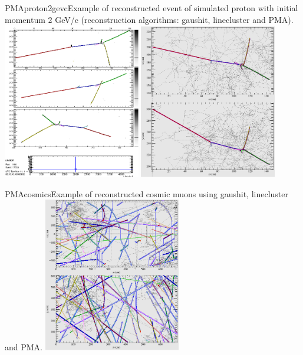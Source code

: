 \begin{cdrfigure}{PMAproton2gevc}{Example of reconstructed event of simulated proton with initial momentum 2 GeV/c (reconstruction algorithms: gaushit, linecluster and PMA).}
\includegraphics[width=0.45\textwidth]{figures/evdtwqproj117703.png}
\includegraphics[width=0.45\textwidth]{figures/evdlarortho3d117703.png}
\end{cdrfigure}
\begin{cdrfigure}{PMAcosmics}{Example of reconstructed cosmic muons using gaushit, linecluster and PMA.}
\includegraphics[width=0.45\textwidth]{figures/evdlarortho3d11302.png}
\end{cdrfigure}



